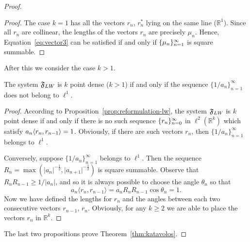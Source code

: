 \begin{proof}
\begin{proof}
      The case $k=1$ has all the vectors $r_n$, $r^*_n$ lying on the same line ($\mathbb{R}^1$).
      Since all $r_n$ are collinear, the lengths of the vectors $r_n$ are precisely $\mu_n$.
      Hence, Equation~\eqref{eq:vector3} can be satisfied if and only if $\{{\mu}_n\}_{n=1}^\infty$ is square summable.
    \end{proof}

    After this we consider the case $k > 1$.
    \begin{prop}
      The system $\mathfrak{F}_{LW}$ is $k$ point dense \textup($k > 1$\textup) if and only if the sequence $\{1/a_n\}_{n=1}^\infty$
        does not belong to $\ell^1$.
    \end{prop}
    \begin{proof}
      According to Proposition~\ref{prop:reformulation-lw}, the system $\mathfrak{F}_{LW}$ is $k$ point dense
        if and only if there is no such sequence $\{{r}_n\}_{n=0}^\infty$ in $\ell^2(\mathbb{R}^k)$ which satisfy $a_n \langle r_n, r_{n-1} \rangle = 1$.
      Obviously, if there are such vectors $r_n$, then $\{1/a_n\}_{n=1}^\infty$ belongs to $\ell^1$.

      Conversely, suppose $\{1/a_n\}_{n=1}^\infty$ belongs to $\ell^1$.
      Then the sequence $R_n = \max(\lvert a_n \rvert^{-\frac{1}{2}}, \lvert a_{n+1} \rvert^{-\frac{1}{2}})$ is square summable.
      Observe that $R_nR_{n-1} \geq 1/\lvert a_n\rvert$, and so it is always possible to choose the angle $\theta_n$ so that
      \[
        a_n \langle r_n, r_{n-1} \rangle = a_n R_n R_{n-1}\cos{\theta_n} = 1.
      \]
      Now we have defined the lengths for $r_n$ and the angles between each two consecutive vectors $r_{n-1}$, $r_n$.
      Obviously, for any $k \geq 2$ we are able to place the vectors $r_n$ in $\mathbb{R}^k$.
    \end{proof}
    The last two propositions prove Theorem~\ref{thm:katavolos}.
  \end{proof}
